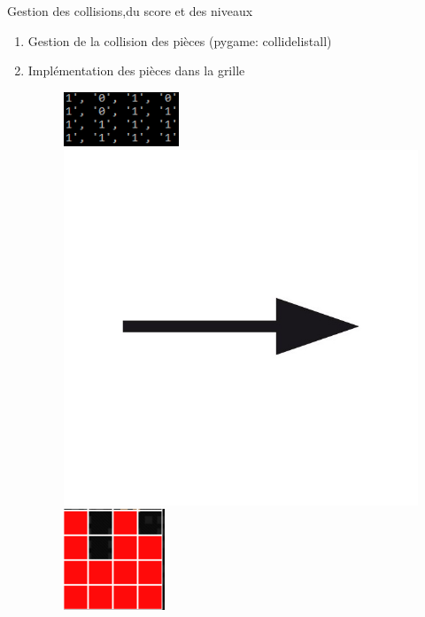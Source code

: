 \documentclass{beamer}
\begin{document}
	
	\begin{frame}{Gestion des collisions,du score et des niveaux}
	
		\begin{enumerate}
			\item Gestion de la collision des pièces (pygame: collidelistall)
			\newline
			
			\item Implémentation des pièces dans la grille
			\newline
			
			\begin{figure}[t]
			
        	\includegraphics[scale=0.8]{images/console.PNG}\hfill
        	\includegraphics[scale=0.05]{images/image.jpg} \hfill        	
        	\includegraphics[scale=0.5]{images/jeu.PNG}
        	

\end{figure}
\end{enumerate}
\end{frame}
\end{document}
